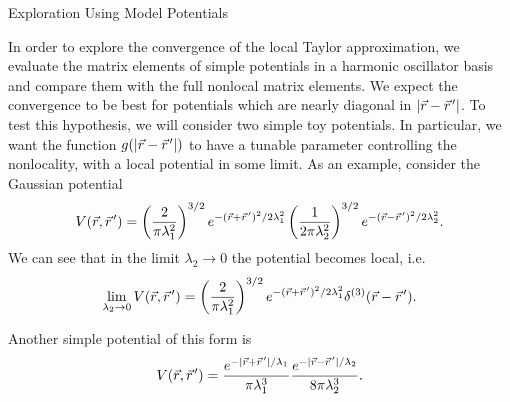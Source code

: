 \begin{section}{Exploration Using Model Potentials\label{sec:toyModel}}

In order to explore the convergence of the local Taylor approximation, we evaluate the matrix elements of simple potentials in a harmonic oscillator basis and compare them with the full nonlocal matrix elements.  We expect the convergence to be best for potentials which are nearly diagonal in $|\vec{r}-\vec{r}\mkern2mu'|$. To test this hypothesis, we will consider two simple toy potentials. In particular, we want the function $g(|\vec{r}-\vec{r}\mkern2mu'|)$ to have a tunable parameter controlling the nonlocality, with a local potential in some limit. As an example, consider the Gaussian potential
\begin{equation}\label{eq:gaussToy}
V(\vec{r},\vec{r}\mkern2mu')=\left(\frac{2}{\pi\lambda_1^2}\right)^{3/2}e^{-(\vec{r}+\vec{r}\mkern2mu')^2/2\lambda_1^2} \left(\frac{1}{2\pi\lambda_2^2}\right)^{3/2}e^{-(\vec{r}-\vec{r}\mkern2mu')^2/2\lambda_2^2}.
\end{equation}
We can see that in the limit $\lambda_2\rightarrow 0$ the potential becomes local, i.e.
\begin{equation}
\lim_{\lambda_2\rightarrow0}V(\vec{r},\vec{r}\mkern2mu')=\left(\frac{2}{\pi\lambda_1^2}\right)^{3/2}e^{-(\vec{r}+\vec{r}\mkern2mu')^2/2\lambda_1^2}\delta^{(3)}(\vec{r}-\vec{r}\mkern2mu').
\end{equation}

Another simple potential of this form is
\begin{equation}
V(\vec{r},\vec{r}\mkern2mu')=\frac{e^{-|\vec{r}+\vec{r}\mkern2mu'|/\lambda_1}}{\pi\lambda_1^3}\frac{e^{-|\vec{r}-\vec{r}\mkern2mu'|/\lambda_2}}{8\pi\lambda_2^3}.
\end{equation}


\end{section}
